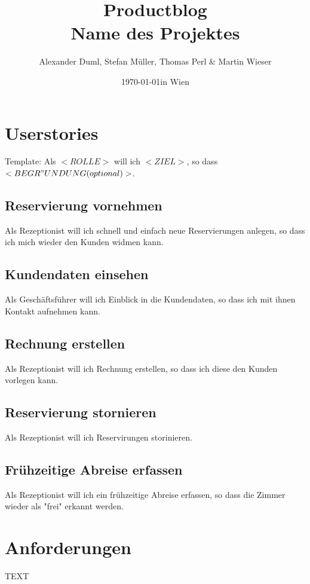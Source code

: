 \documentclass[11pt]{scrartcl}
\title{Productblog \\ \large Name des Projektes}
\author{Alexander Duml, Stefan Müller, Thomas Perl \& Martin Wieser}
\date{\today in Wien}
\begin{document}
\maketitle

\section{Userstories}

Template: Als $<ROLLE>$ will ich $<ZIEL>$, so dass $<BEGR"UNDUNG (optional)>$.

\subsection{Reservierung vornehmen}

Als Rezeptionist will ich schnell und einfach neue Reservierungen anlegen, so dass ich mich wieder den Kunden widmen kann.

\subsection{Kundendaten einsehen}

Als Geschäftsführer will ich Einblick in die Kundendaten, so dass ich mit ihnen Kontakt aufnehmen kann.

\subsection{Rechnung erstellen}

Als Rezeptionist will ich Rechnung erstellen, so dass ich diese den Kunden vorlegen kann.

\subsection{Reservierung stornieren}

Als Rezeptionist will ich Reservirungen storinieren.

\subsection{Frühzeitige Abreise erfassen}

Als Rezeptionist will ich ein frühzeitige Abreise erfassen, so dass die Zimmer wieder als "frei" erkannt werden.

\section{Anforderungen}

TEXT
\end{document}
